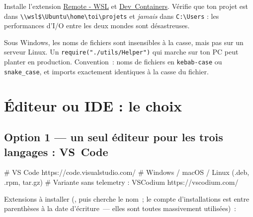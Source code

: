 \documentclass[12pt,a4paper,twoside,openright]{book}
\newcommand{\fichier}[1]{\texttt{\color{pathgreen}#1}}
\newcommand{\link}[2]{\href{#2}{#1}}
\begin{document}
Installe l'extension \link{Remote - WSL}{https://marketplace.visualstudio.com/items?itemName=ms-vscode-remote.remote-wsl}
et \link{Dev~Containers}{https://marketplace.visualstudio.com/items?itemName=ms-vscode-remote.remote-containers}.
V\'erifie que ton projet est dans \verb|\\wsl$\Ubuntu\home\toi\projets| et \emph{jamais} dans
\fichier{C:\textbackslash Users} : les performances d'I/O entre les deux mondes sont d\'esastreuses.

\begin{piege}
Sous Windows, les noms de fichiers sont insensibles \`a la casse, mais pas sur un serveur Linux.
Un \verb|require("./utils/Helper")| qui marche sur ton PC peut planter en production.
Convention~: noms de fichiers en \texttt{kebab-case} ou \texttt{snake\_case}, et imports
exactement identiques \`a la casse du fichier.
\end{piege}

\section{\'Editeur ou IDE : le choix}

\subsection{Option 1 --- un seul \'editeur pour les trois langages : VS~Code}

\begin{terminal}
# VS Code
https://code.visualstudio.com/                # Windows / macOS / Linux (.deb, .rpm, tar.gz)
# Variante sans telemetry : VSCodium
https://vscodium.com/
\end{terminal}

Extensions \`a installer (, puis cherche le nom~; le compte d'installations est
entre parenth\`eses \`a la date d'\'ecriture~--- elles sont toutes massivement utilis\'ees)~:
\end{document}
